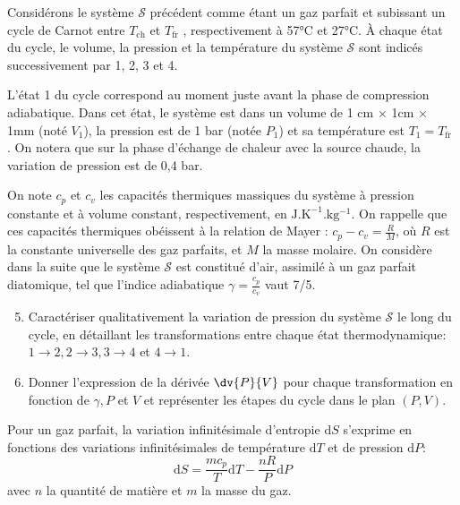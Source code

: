 \documentclass[a4paper, 12pt, garamond]{book}
\begin{document}
Considérons le système \(\mathcal{S}\) précédent comme étant un gaz
parfait et subissant un cycle de Carnot entre \(T_\mathrm{ch}\) et
\(T_\mathrm{fr}\) , respectivement à 57°C et 27°C. À chaque état du
cycle, le volume, la pression et la température du système
\(\mathcal{S}\) sont indicés successivement par 1, 2, 3 et 4.

L'état 1 du cycle correspond au moment juste avant la phase de
compression adiabatique. Dans cet état, le système est dans un volume de
1 cm × 1cm × 1mm (noté \(V_1\)), la pression est de 1 bar (notée
\(P_1\)) et sa température est \(T_1 = T_\mathrm{fr}\) . On notera que
sur la phase d'échange de chaleur avec la source chaude, la variation de
pression est de 0,4 bar.

On note \(c_p\) et \(c_v\) les capacités thermiques massiques du système
à pression constante et à volume constant, respectivement, en
\(\mathrm{J.K^{-1}.kg^{-1}}\). On rappelle que ces capacités thermiques
obéissent à la relation de Mayer : \(c_p - c_v = \frac{R}{M}\), où \(R\)
est la constante universelle des gaz parfaits, et \(M\) la masse
molaire. On considère dans la suite que le système \(\mathcal{S}\) est
constitué d'air, assimilé à un gaz parfait diatomique, tel que l'indice
adiabatique \(\gamma = \frac{c_p}{c_v}\) vaut 7/5.

\begin{enumerate}
	\setcounter{enumi}{4}
	\item
	      Caractériser qualitativement la variation de pression du système
	      \(\mathcal{S}\) le long du cycle, en détaillant les transformations
	      entre chaque état thermodynamique: \(1 \to 2, 2 \to 3, 3 \to 4\) et
	      \(4 \to 1\).
	\item
	      Donner l'expression de la dérivée \(\dv{P}{V}\) pour chaque
	      transformation en fonction de \(\gamma, P\) et \(V\) et représenter
	      les étapes du cycle dans le plan \((P,V)\).
\end{enumerate}

Pour un gaz parfait, la variation infinitésimale d'entropie
\(\mathrm{d} S\) s'exprime en fonctions des variations infinitésimales
de température \(\mathrm{d} T\) et de pression \(\mathrm{d} P\):
\[\mathrm{d}S = \frac{m c_p}{T} \mathrm{d}T - \frac{nR}{P}\mathrm{d}P \]
avec \(n\) la quantité de matière et \(m\) la masse du gaz.
\end{document}
